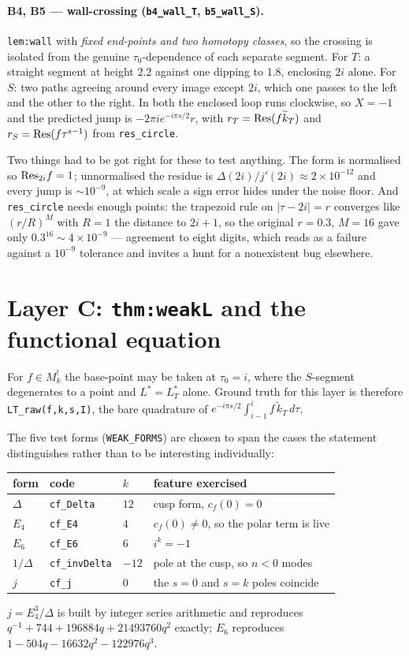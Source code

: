\documentclass[11pt]{article}
\newcommand{\tk}{\widetilde{k}_T}
\newcommand{\code}[1]{\texttt{#1}}
\begin{document}
\paragraph{B4, B5 --- wall-crossing (\code{b4\_wall\_T}, \code{b5\_wall\_S}).}
\code{lem:wall} with \emph{fixed end-points and two homotopy classes}, so the crossing is
isolated from the genuine $\tau_0$-dependence of each separate segment. For $T$: a straight
segment at height $2.2$ against one dipping to $1.8$, enclosing $2i$ alone. For $S$: two paths
agreeing around every image except $2i$, which one passes to the left and the other to the
right. In both the enclosed loop runs clockwise, so $X=-1$ and the predicted jump is
$-2\pi ie^{-i\pi s/2}r$, with $r_T={\rm Res}(f\tk)$ and $r_S={\rm Res}(f\tau^{s-1})$ from
\code{res\_circle}.

Two things had to be got right for these to test anything. The form is normalised so
${\rm Res}_{2i}f=1$; unnormalised the residue is $\Delta(2i)/j'(2i)\approx2\times10^{-12}$ and
every jump is $\sim10^{-9}$, at which scale a sign error hides under the noise floor. And
\code{res\_circle} needs enough points: the trapezoid rule on $|\tau-2i|=r$ converges like
$(r/R)^M$ with $R=1$ the distance to $2i+1$, so the original $r=0.3$, $M=16$ gave only
$0.3^{16}\sim4\times10^{-9}$ --- agreement to eight digits, which reads as a failure against a
$10^{-9}$ tolerance and invites a hunt for a nonexistent bug elsewhere.

\section{Layer C: \code{thm:weakL} and the functional equation}

For $f\in M^!_k$ the base-point may be taken at $\tau_0=i$, where the $S$-segment degenerates to
a point and $L^*=L^*_T$ alone. Ground truth for this layer is therefore
\code{LT\_raw(f,k,s,I)}, the bare quadrature of $e^{-i\pi s/2}\!\int_{i-1}^{i}f\,\tk\,d\tau$.

The five test forms (\code{WEAK\_FORMS}) are chosen to span the cases the statement
distinguishes rather than to be interesting individually:
\begin{center}
\begin{tabular}{@{}llll@{}}
form & code & $k$ & feature exercised\\
\hline
$\Delta$    & \code{cf\_Delta}    & $12$  & cusp form, $c_f(0)=0$\\
$E_4$       & \code{cf\_E4}       & $4$   & $c_f(0)\ne0$, so the polar term is live\\
$E_6$       & \code{cf\_E6}       & $6$   & $i^k=-1$\\
$1/\Delta$  & \code{cf\_invDelta} & $-12$ & pole at the cusp, so $n<0$ modes\\
$j$         & \code{cf\_j}        & $0$   & the $s=0$ and $s=k$ poles coincide\\
\end{tabular}
\end{center}
\noindent$j=E_4^3/\Delta$ is built by integer series arithmetic and reproduces
$q^{-1}+744+196884q+21493760q^2$ exactly; $E_6$ reproduces $1-504q-16632q^2-122976q^3$.
\end{document}
